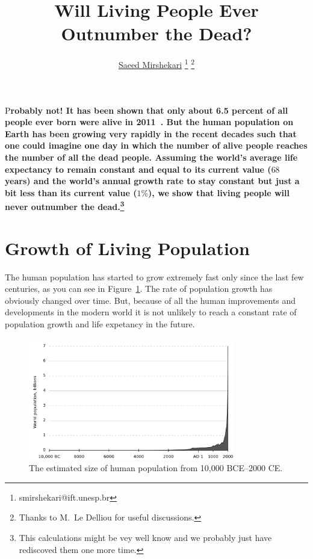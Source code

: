 \documentclass[DIV=calc, paper=a4, fontsize=11pt, twocolumn]{scrartcl}	 %
\title{Will Living People Ever Outnumber the Dead?} %
\author{\href{http://www.physics.wustl.edu/smirshekari}{Saeed Mirshekari} \thanks{smirshekari@ift.unesp.br} \thanks{Thanks to M.~Le Delliou for useful discussions.
}\; } %
\date{} %
\newcommand{\initial}[1]{ %
\lettrine[lines=3,lhang=0.3,nindent=0em]{
\color{DarkGoldenrod}
{\textsf{#1}}}{}}
\begin{document}
\maketitle %

\thispagestyle{fancy} %


\initial{P}\textbf{robably not! It has been shown that only about 6.5 percent of all people ever born were alive in 2011~\cite{Carl}. But the human population on Earth has been growing very rapidly in the recent decades such that one could imagine one day in which the number of alive people reaches the number of all the dead people. Assuming the world's average life expectancy to remain constant and equal to its current value ($68$ years) and the world's annual growth rate to stay constant but just a bit less than its current value ($1\%$), we show that living people will never outnumber the dead.\footnote{This calculations might be vey well know and we probably just have rediscoved them one more time.}}


\section*{Growth of Living Population}
The human population has started to grow extremely fast only since the last few centuries, as you can see in Figure~\ref{fig:popcurve}. The rate of population growth has obviously changed over time. But, because of all the human improvements and developments in the modern world it is not unlikely to reach a constant rate of population growth and life expetancy in the future.

\begin{figure}
\centering
\includegraphics[width=9cm]{Population_curve.png}
\caption{The estimated size of human population from 10,000 BCE--2000 CE. \cite{wikipedia}}
\label{fig:popcurve}
\end{figure}
\end{document}
